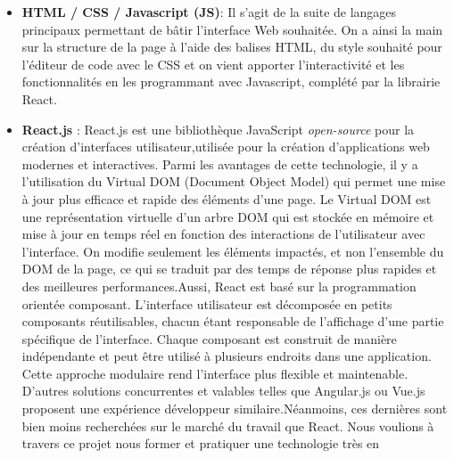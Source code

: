 \documentclass[12pt]{article}
\begin{document}
      \begin{itemize}
            \item
                  \textbf{HTML / CSS / Javascript (JS)}: Il s'agit de la suite de
                  langages principaux permettant de bâtir l'interface Web souhaitée. On
                  a ainsi la main sur la structure de la page à l'aide des balises HTML,
                  du style souhaité pour l'éditeur de code avec le CSS et on vient
                  apporter l'interactivité et les fonctionnalités en les programmant
                  avec Javascript, complété par la librairie React.
            \item
                  \textbf{React.js} \cite{react}: React.js est
                  une bibliothèque JavaScript \emph{open-source} pour la création
                  d'interfaces utilisateur,utilisée pour la création d'applications web
                  modernes et interactives. Parmi les avantages de cette technologie, il
                  y a l'utilisation du Virtual DOM (Document Object Model) qui permet
                  une mise à jour plus efficace et rapide des éléments d'une page. Le
                  Virtual DOM est une représentation virtuelle d'un arbre DOM qui est
                  stockée en mémoire et mise à jour en temps réel en fonction des
                  interactions de l'utilisateur avec l'interface. On modifie seulement
                  les éléments impactés, et non l'ensemble du DOM de la page, ce qui se
                  traduit par des temps de réponse plus rapides et des meilleures
                  performances.\newline  Aussi, React est basé sur la programmation
                  orientée composant. L'interface utilisateur est décomposée en petits
                  composants réutilisables, chacun étant responsable de l'affichage
                  d'une partie spécifique de l'interface. Chaque composant est construit
                  de manière indépendante et peut être utilisé à plusieurs endroits dans
                  une application. Cette approche modulaire rend l'interface plus
                  flexible et maintenable. D'autres solutions concurrentes et valables
                  telles que Angular.js \cite{angularjs} ou
                  Vue.js \cite{vuejs} proposent une expérience
                  développeur similaire.\newline  Néanmoins, ces dernières sont bien
                  moins recherchées sur le marché du travail que React. Nous voulions à
                  travers ce projet nous former et pratiquer une technologie très en

\end{itemize}
\end{document}
